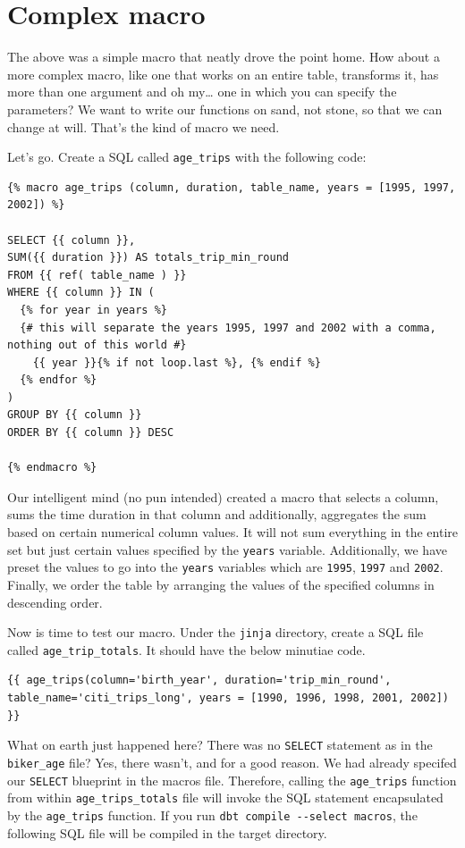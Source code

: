 \documentclass[
]{book}
\begin{document}
\hypertarget{complex-macro}{%
\section{Complex macro}\label{complex-macro}}

The above was a simple macro that neatly drove the point home. How about a more complex macro, like one that works on an entire table, transforms it, has more than one argument and oh my\ldots{} one in which you can specify the parameters? We want to write our functions on sand, not stone, so that we can change at will. That's the kind of macro we need.

Let's go. Create a SQL called \texttt{age\_trips} with the following code:

\begin{verbatim}
{% macro age_trips (column, duration, table_name, years = [1995, 1997, 2002]) %}

SELECT {{ column }}, 
SUM({{ duration }}) AS totals_trip_min_round
FROM {{ ref( table_name ) }}
WHERE {{ column }} IN (
  {% for year in years %}
  {# this will separate the years 1995, 1997 and 2002 with a comma, nothing out of this world #}
    {{ year }}{% if not loop.last %}, {% endif %}
  {% endfor %}
)
GROUP BY {{ column }}
ORDER BY {{ column }} DESC

{% endmacro %}
\end{verbatim}

Our intelligent mind (no pun intended) created a macro that selects a column, sums the time duration in that column and additionally, aggregates the sum based on certain numerical column values. It will not sum everything in the entire set but just certain values specified by the \texttt{years} variable. Additionally, we have preset the values to go into the \texttt{years} variables which are \texttt{1995}, \texttt{1997} and \texttt{2002}. Finally, we order the table by arranging the values of the specified columns in descending order.

Now is time to test our macro. Under the \texttt{jinja} directory, create a SQL file called \texttt{age\_trip\_totals}. It should have the below minutiae code.

\begin{verbatim}
{{ age_trips(column='birth_year', duration='trip_min_round',
table_name='citi_trips_long', years = [1990, 1996, 1998, 2001, 2002]) }}
\end{verbatim}

What on earth just happened here? There was no \texttt{SELECT} statement as in the \texttt{biker\_age} file? Yes, there wasn't, and for a good reason. We had already specifed our \texttt{SELECT} blueprint in the macros file. Therefore, calling the \texttt{age\_trips} function from within \texttt{age\_trips\_totals} file will invoke the SQL statement encapsulated by the \texttt{age\_trips} function. If you run \texttt{dbt\ compile\ -\/-select\ macros}, the following SQL file will be compiled in the target directory.
\end{document}
